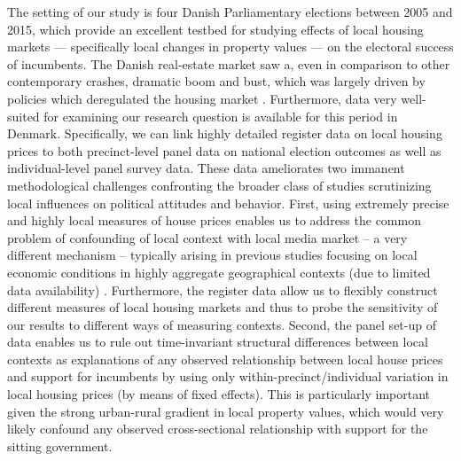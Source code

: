 \documentclass[12pt,a4paper]{article}
\begin{document}
The setting of our study is four Danish Parliamentary elections between 2005 and 2015, which provide an excellent testbed for studying effects of local housing markets — specifically local changes in property values — on the electoral success of incumbents. The Danish real-estate market saw a, even in comparison to other contemporary crashes, dramatic boom and bust, which was largely driven by policies which deregulated the housing market \citep{dam2011housing}. Furthermore, data very well-suited for examining our research question is available for this period in Denmark. Specifically, we can link highly detailed register data on local housing prices to both precinct-level panel data on national election outcomes as well as individual-level panel survey data. These data ameliorates two immanent methodological challenges confronting the broader class of studies scrutinizing local influences on political attitudes and behavior. First, using extremely precise and highly local measures of house prices enables us to address the common problem of confounding of local context with local media market -- a very different mechanism -- typically arising in previous studies focusing on local economic conditions in highly aggregate geographical contexts (due to limited data availability) \citep{bisgaard2016reconsidering}. Furthermore, the register data allow us to flexibly construct different measures of local housing markets and thus to probe the sensitivity of our results to different ways of measuring contexts. Second, the panel set-up of data enables us to rule out time-invariant structural differences between local contexts as explanations of any observed relationship between local house prices and support for incumbents by using only within-precinct/individual variation in local housing prices (by means of fixed effects). This is particularly important given the strong urban-rural gradient in local property values, which would very likely confound any observed cross-sectional relationship with support for the sitting government. 
\end{document}
